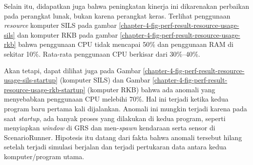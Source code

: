 Selain itu, didapatkan juga bahwa peningkatan kinerja ini dikarenakan perbaikan
pada perangkat lunak, bukan karena perangkat keras. Terlihat penggunaan
\textit{resource} komputer SILS pada gambar
\ref{chapter-4-fig-perf-result-resource-usage-sils} dan komputer RKB pada gambar
\ref{chapter-4-fig-perf-result-resource-usage-rkb} bahwa penggunaan CPU tidak
mencapai 50\% dan penggunaan RAM di sekitar 10\%. Rata-rata penggunaan CPU
berkisar dari 30\%--40\%.

Akan tetapi, dapat dilihat juga pada Gambar
\ref{chapter-4-fig-perf-result-resource-usage-sils-startup} (komputer SILS) dan
Gambar \ref{chapter-4-fig-perf-result-resource-usage-rkb-startup} (komputer RKB)
bahwa ada anomali yang menyebabkan penggunaan CPU melebihi 70\%. Hal ini terjadi
ketika kedua program baru pertama kali dijalankan. Anomali ini mungkin terjadi
karena pada saat \textit{startup}, ada banyak proses yang dilakukan di kedua
program, seperti menyiapkan \textit{window} di GRS dan men-\textit{spawn}
kendaraan serta sensor di ScenarioRunner. Hipotesis itu datang dari fakta bahwa
anomali tersebut hilang setelah terjadi simulasi berjalan dan terjadi pertukaran
data antara kedua komputer/program utama.
